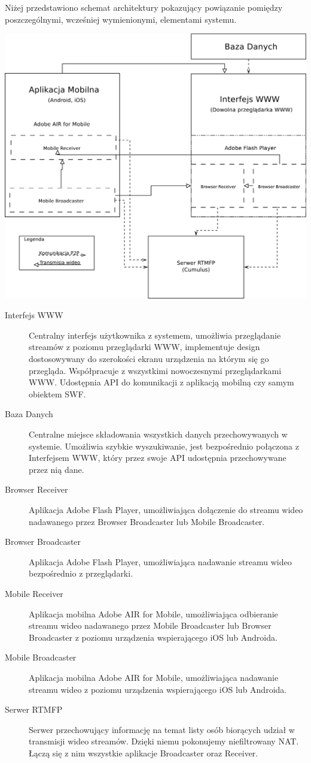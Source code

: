 \newpage
Niżej przedstawiono schemat architektury pokazujący powiązanie pomiędzy poszczególnymi, wcześniej wymienionymi, elementami systemu.
\begin{center}
    \includegraphics[width=\textwidth]{diagramy/architektura.pdf}
\end{center}
\begin{description}
    \item[Interfejs WWW]{Centralny interfejs użytkownika z systemem, umożliwia przeglądanie streamów z poziomu przeglądarki WWW, implementuje design dostosowywany do szerokości ekranu urządzenia na którym się go przegląda. Współpracuje z wszystkimi nowoczesnymi przeglądarkami WWW. Udostępnia API do komunikacji z aplikacją mobilną czy samym obiektem SWF.}
    \item[Baza Danych]{Centralne miejsce składowania wszystkich danych przechowywanych w systemie. Umożliwia szybkie wyszukiwanie, jest bezpośrednio połączona z Interfejsem WWW, który przez swoje API udostępnia przechowywane przez nią dane.}
    \item[Browser Receiver]{Aplikacja Adobe Flash Player, umożliwiająca dołączenie do streamu wideo nadawanego przez Browser Broadcaster lub Mobile Broadcaster.}
    \item[Browser Broadcaster]{Aplikacja Adobe Flash Player, umożliwiająca nadawanie streamu wideo bezpośrednio z przeglądarki.}
    \item[Mobile Receiver]{Aplikacja mobilna Adobe AIR for Mobile, umożliwiająca odbieranie streamu wideo nadawanego przez Mobile Broadcaster lub Browser Broadcaster z poziomu urządzenia wspierającego iOS lub Androida.}
    \item[Mobile Broadcaster]{Aplikacja mobilna Adobe AIR for Mobile, umożliwiająca nadawanie streamu wideo z poziomu urządzenia wspierającego iOS lub Androida.}
    \item[Serwer RTMFP]{Serwer przechowujący informację na temat listy osób biorących udział w transmisji wideo streamów. Dzięki niemu pokonujemy niefiltrowany NAT. Łączą się z nim wszystkie aplikacje Broadcaster oraz Receiver.}
\end{description}

